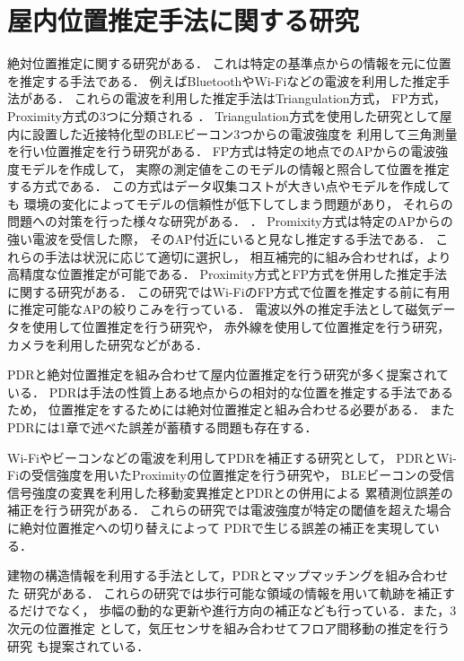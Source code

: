 \section{屋内位置推定手法に関する研究}
絶対位置推定に関する研究がある．
これは特定の基準点からの情報を元に位置を推定する手法である．
例えばBluetoothやWi-Fiなどの電波を利用した推定手法がある．
これらの電波を利用した推定手法はTriangulation方式，
FP方式，Proximity方式の3つに分類される
\cite{wireless-lan-summary}．
Triangulation方式を使用した研究として屋内に設置した近接特化型のBLEビーコン3つからの電波強度を
利用して三角測量を行い位置推定を行う研究がある\cite{ble-indoor}\cite{ble-tandem}\cite{triangulation-kalman}．
FP方式は特定の地点でのAPからの電波強度モデルを作成して，
実際の測定値をこのモデルの情報と照合して位置を推定する方式である．
この方式はデータ収集コストが大きい点やモデルを作成しても
環境の変化によってモデルの信頼性が低下してしまう問題があり，
それらの問題への対策を行った様々な研究がある．
\cite{gaussian-mixture-model}
\cite{wireless-lan-cost-reduction}
\cite{fingerprint-auto-update}
\cite{wi-fi-fingerprint-domain}．
Promixity方式は特定のAPからの強い電波を受信した際，
そのAP付近にいると見なし推定する手法である．
これらの手法は状況に応じて適切に選択し，
相互補完的に組み合わせれば，より高精度な位置推定が可能である．
Proximity方式とFP方式を併用した推定手法に関する研究がある\cite{proximity-fingerprint}．
この研究ではWi-FiのFP方式で位置を推定する前に有用に推定可能なAPの絞りこみを行っている．
電波以外の推定手法として磁気データを使用して位置推定を行う研究\cite{pdr-mag}や，
赤外線を使用して位置推定を行う研究\cite{infrared}，カメラを利用した研究\cite{camera}などがある．

PDRと絶対位置推定を組み合わせて屋内位置推定を行う研究が多く提案されている．
PDRは手法の性質上ある地点からの相対的な位置を推定する手法であるため，
位置推定をするためには絶対位置推定と組み合わせる必要がある．
またPDRには1章で述べた誤差が蓄積する問題も存在する．

Wi-Fiやビーコンなどの電波を利用してPDRを補正する研究として，
PDRとWi-Fiの受信強度を用いたProximityの位置推定を行う研究\cite{pdr-wifi}\cite{pdr-rss-fusion}や，
BLEビーコンの受信信号強度の変異を利用した移動変異推定とPDRとの併用による
累積測位誤差の補正を行う研究\cite{pdr-ble}がある．
これらの研究では電波強度が特定の閾値を超えた場合に絶対位置推定への切り替えによって
PDRで生じる誤差の補正を実現している．

建物の構造情報を利用する手法として，PDRとマップマッチングを組み合わせた
研究\cite{pdr-map}がある．
これらの研究では歩行可能な領域の情報を用いて軌跡を補正するだけでなく，
歩幅の動的な更新や進行方向の補正なども行っている．また，3次元の位置推定
として，気圧センサを組み合わせてフロア間移動の推定を行う研究\cite{pdr-wifi}\cite{pdr-stable}
も提案されている．

